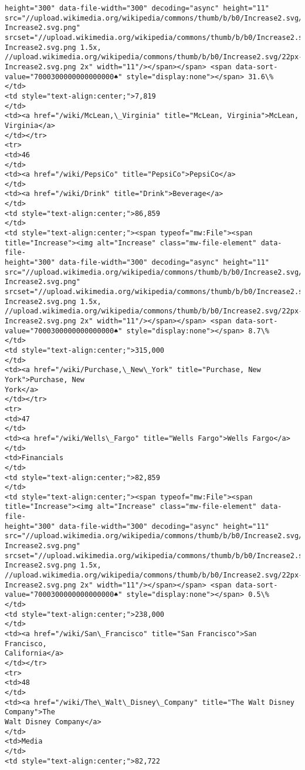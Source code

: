 \documentclass[11pt]{article}
\begin{document}
\begin{Verbatim}[commandchars=\\\{\}]
height="300" data-file-width="300" decoding="async" height="11"
src="//upload.wikimedia.org/wikipedia/commons/thumb/b/b0/Increase2.svg/11px-
Increase2.svg.png"
srcset="//upload.wikimedia.org/wikipedia/commons/thumb/b/b0/Increase2.svg/17px-
Increase2.svg.png 1.5x,
//upload.wikimedia.org/wikipedia/commons/thumb/b/b0/Increase2.svg/22px-
Increase2.svg.png 2x" width="11"/></span></span> <span data-sort-
value="7000300000000000000♠" style="display:none"></span> 31.6\%
</td>
<td style="text-align:center;">7,819
</td>
<td><a href="/wiki/McLean,\_Virginia" title="McLean, Virginia">McLean,
Virginia</a>
</td></tr>
<tr>
<td>46
</td>
<td><a href="/wiki/PepsiCo" title="PepsiCo">PepsiCo</a>
</td>
<td><a href="/wiki/Drink" title="Drink">Beverage</a>
</td>
<td style="text-align:center;">86,859
</td>
<td style="text-align:center;"><span typeof="mw:File"><span
title="Increase"><img alt="Increase" class="mw-file-element" data-file-
height="300" data-file-width="300" decoding="async" height="11"
src="//upload.wikimedia.org/wikipedia/commons/thumb/b/b0/Increase2.svg/11px-
Increase2.svg.png"
srcset="//upload.wikimedia.org/wikipedia/commons/thumb/b/b0/Increase2.svg/17px-
Increase2.svg.png 1.5x,
//upload.wikimedia.org/wikipedia/commons/thumb/b/b0/Increase2.svg/22px-
Increase2.svg.png 2x" width="11"/></span></span> <span data-sort-
value="7000300000000000000♠" style="display:none"></span> 8.7\%
</td>
<td style="text-align:center;">315,000
</td>
<td><a href="/wiki/Purchase,\_New\_York" title="Purchase, New York">Purchase, New
York</a>
</td></tr>
<tr>
<td>47
</td>
<td><a href="/wiki/Wells\_Fargo" title="Wells Fargo">Wells Fargo</a>
</td>
<td>Financials
</td>
<td style="text-align:center;">82,859
</td>
<td style="text-align:center;"><span typeof="mw:File"><span
title="Increase"><img alt="Increase" class="mw-file-element" data-file-
height="300" data-file-width="300" decoding="async" height="11"
src="//upload.wikimedia.org/wikipedia/commons/thumb/b/b0/Increase2.svg/11px-
Increase2.svg.png"
srcset="//upload.wikimedia.org/wikipedia/commons/thumb/b/b0/Increase2.svg/17px-
Increase2.svg.png 1.5x,
//upload.wikimedia.org/wikipedia/commons/thumb/b/b0/Increase2.svg/22px-
Increase2.svg.png 2x" width="11"/></span></span> <span data-sort-
value="7000300000000000000♠" style="display:none"></span> 0.5\%
</td>
<td style="text-align:center;">238,000
</td>
<td><a href="/wiki/San\_Francisco" title="San Francisco">San Francisco,
California</a>
</td></tr>
<tr>
<td>48
</td>
<td><a href="/wiki/The\_Walt\_Disney\_Company" title="The Walt Disney Company">The
Walt Disney Company</a>
</td>
<td>Media
</td>
<td style="text-align:center;">82,722

\end{Verbatim}
\end{document}
